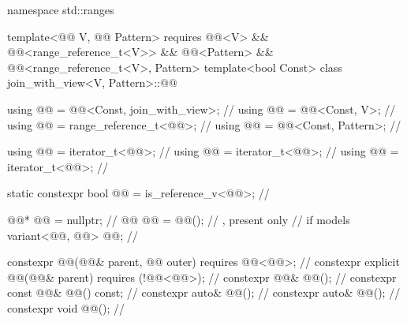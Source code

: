 %
\begin{codeblock}
namespace std::ranges {
  template<@@ V, @@ Pattern>
    requires @@<V> && @@<range_reference_t<V>>
          && @@<Pattern> && @@<range_reference_t<V>, Pattern>
  template<bool Const>
  class join_with_view<V, Pattern>::@@ {
    using @@ = @@<Const, join_with_view>;                  // \expos
    using @@ = @@<Const, V>;                                 // \expos
    using @@ = range_reference_t<@@>;                          // \expos
    using @@ = @@<Const, Pattern>;                    // \expos

    using @@ = iterator_t<@@>;                                 // \expos
    using @@ = iterator_t<@@>;                            // \expos
    using @@ = iterator_t<@@>;                        // \expos

    static constexpr bool @@ = is_reference_v<@@>;   // \expos

    @@* @@ = nullptr;                                          // \expos
    @@ @@ = @@();                          // \expos, present only
                                                                // if  models 
    variant<@@, @@> @@;                          // \expos

    constexpr @@(@@& parent, @@ outer)
      requires @@<@@>;                                     // \expos
    constexpr explicit @@(@@& parent)
      requires (!@@<@@>);                                  // \expos
    constexpr @@& @@();                                       // \expos
    constexpr const @@& @@() const;                           // \expos
    constexpr auto& @@();                                     // \expos
    constexpr auto& @@();                                        // \expos
    constexpr void @@();                                           // \expos

}}
\end{codeblock}
